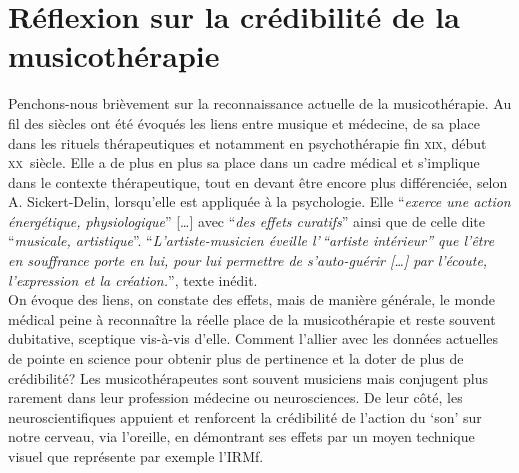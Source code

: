 \section{Réflexion sur la crédibilité de la musicothérapie }

Penchons-nous brièvement sur la reconnaissance actuelle de la musicothérapie.
Au fil des siècles ont été évoqués les liens entre musique et médecine, de sa place dans les
rituels thérapeutiques et notamment en psychothérapie fin \textsc{xix}\ieme,
début \textsc{xx}\ieme\ siècle.
Elle a de plus en plus sa place dans un cadre médical et s'implique dans le contexte thérapeutique, tout 
en devant être encore plus différenciée, selon A. Sickert-Delin, lorsqu'elle est appliquée à la  psychologie.
Elle \enquote{\emph{exerce une action
énergétique, physiologique}} [\dots] avec \enquote{\emph{des effets curatifs}}
ainsi que de celle dite \enquote{\emph{musicale, artistique}}.
\enquote{\emph{L'artiste-musicien éveille l'\,``artiste intérieur'' que l'être
en souffrance porte en lui, pour lui permettre de s'auto-guérir [\dots] par
l'écoute, l'expression et la création.}}\autocite[14] {viret:b},
texte inédit.
\\
On évoque des liens, on constate des effets, mais de manière générale, le monde médical peine à reconnaître la réelle place de la musicothérapie et reste souvent dubitative, sceptique vis-à-vis d'elle.
 Comment l'allier avec les données actuelles de pointe en
science pour obtenir plus de pertinence
et la doter de plus de crédibilité?
Les musicothérapeutes sont souvent musiciens mais conjugent plus
rarement dans leur profession
médecine ou neurosciences. De leur côté, les neuroscientifiques appuient
et renforcent la crédibilité de l'action du `son' sur notre cerveau, via
l'oreille, en démontrant ses effets par un moyen technique
visuel que représente par exemple l'IRMf. 
